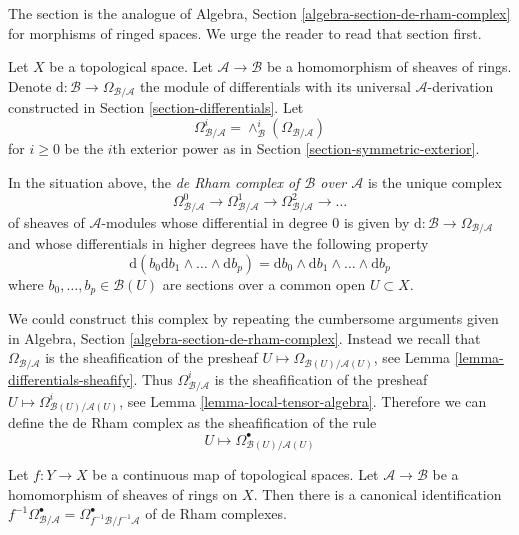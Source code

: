 \noindent
The section is the analogue of
Algebra, Section \ref{algebra-section-de-rham-complex} for morphisms of ringed
spaces. We urge the reader to read that section first.

\medskip\noindent
Let $X$ be a topological space. Let $\mathcal{A} \to \mathcal{B}$ be a
homomorphism of sheaves of rings. Denote
$\text{d} : \mathcal{B} \to \Omega_{\mathcal{B}/\mathcal{A}}$
the module of differentials with its universal $\mathcal{A}$-derivation
constructed in Section \ref{section-differentials}.
Let
$$
\Omega_{\mathcal{B}/\mathcal{A}}^i =
\wedge^i_\mathcal{B}(\Omega_{\mathcal{B}/\mathcal{A}})
$$
for $i \geq 0$ be the $i$th exterior power as in
Section \ref{section-symmetric-exterior}.

\begin{definition}
\label{definition-de-rham-complex}
In the situation above, the
{\it de Rham complex of $\mathcal{B}$ over $\mathcal{A}$}
is the unique complex
$$
\Omega_{\mathcal{B}/\mathcal{A}}^0 \to
\Omega_{\mathcal{B}/\mathcal{A}}^1 \to
\Omega_{\mathcal{B}/\mathcal{A}}^2 \to \ldots
$$
of sheaves of $\mathcal{A}$-modules whose differential in degree
$0$ is given by $\text{d} : \mathcal{B} \to \Omega_{\mathcal{B}/\mathcal{A}}$
and whose differentials in higher degrees have the following property
\begin{equation}
\label{equation-rule}
\text{d}\left(b_0\text{d}b_1 \wedge \ldots \wedge \text{d}b_p\right) =
\text{d}b_0 \wedge \text{d}b_1 \wedge \ldots \wedge \text{d}b_p
\end{equation}
where $b_0, \ldots, b_p \in \mathcal{B}(U)$ are sections over a common
open $U \subset X$.
\end{definition}

\noindent
We could construct this complex by repeating the cumbersome arguments
given in Algebra, Section \ref{algebra-section-de-rham-complex}.
Instead we recall that $\Omega_{\mathcal{B}/\mathcal{A}}$ is the
sheafification of the presheaf
$U \mapsto \Omega_{\mathcal{B}(U)/\mathcal{A}(U)}$, see
Lemma \ref{lemma-differentials-sheafify}.
Thus $\Omega_{\mathcal{B}/\mathcal{A}}^i$ is the sheafification of
the presheaf
$U \mapsto \Omega^i_{\mathcal{B}(U)/\mathcal{A}(U)}$, see
Lemma \ref{lemma-local-tensor-algebra}.
Therefore we can define the de Rham complex
as the sheafification of the rule
$$
U \longmapsto
\Omega^\bullet_{\mathcal{B}(U)/\mathcal{A}(U)}
$$

\begin{lemma}
\label{lemma-pullback-de-rham-complex}
Let $f : Y \to X$ be a continuous map of topological spaces.
Let $\mathcal{A} \to \mathcal{B}$
be a homomorphism of sheaves of rings on $X$.
Then there is a canonical identification
$f^{-1}\Omega^\bullet_{\mathcal{B}/\mathcal{A}} =
\Omega^\bullet_{f^{-1}\mathcal{B}/f^{-1}\mathcal{A}}$
of de Rham complexes.
\end{lemma}

